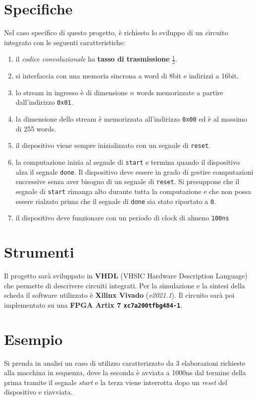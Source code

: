 \documentclass[a4paper]{report}
\begin{document}
\section{Specifiche}
Nel caso specifico di questo progetto, è richiesto lo sviluppo di un circuito integrato con le seguenti caratteristiche: 
\begin{enumerate}
\item il \textit{codice convoluzionale} ha \textbf{tasso di trasmissione} $\frac{1} {2}$.
\item si interfaccia con una memoria sincrona a word di 8bit e indirizzi a 16bit.
\item lo stream in ingresso è di dimensione $n$ words memorizzate a partire dall'indirizzo \texttt{0x01}.
\item la dimensione dello stream è memorizzata all'indirizzo \texttt{0x00} ed è al massimo di 255 words.
\item il dispositivo viene sempre inizializzato con un segnale di \texttt{reset}.
\item la computazione inizia al segnale di \texttt{start} e termina quando il dispositivo alza il segnale \texttt{done}. Il dispositivo deve essere in grado di gestire computazioni successive senza aver bisogno di un segnale di \texttt{reset}. Si presuppone che il segnale di \texttt{start} rimanga alto durante tutta la computazione e che non possa essere rialzato prima che il segnale di \texttt{done} sia stato riportato a \texttt{0}.
\item il dispositivo deve funzionare con un periodo di clock di almeno \texttt{100ns}
\end{enumerate}

\section{Strumenti}
Il progetto sarà sviluppato in \textbf{VHDL} (VHSIC Hardware Description Language) che permette di descrivere circuiti integrati.
Per la simulazione e la sintesi della scheda il software utilizzato è \textbf{Xilinx Vivado} (\textit{v2021.1}).
Il circuito sarà poi implementato su una \textbf{FPGA Artix 7 \texttt{xc7a200tfbg484-1}}.

\section{Esempio}
Si prenda in analisi un caso di utilizzo caratterizzato da 3 elaborazioni richieste alla macchina in sequenza, dove la seconda è avviata a 1000ns dal termine della prima tramite il segnale \textit{start} e la terza viene interrotta dopo un \textit{reset} del dispositivo e riavviata.
\end{document}
